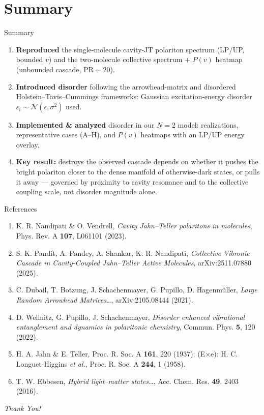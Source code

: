 \documentclass[aspectratio=169,11pt]{beamer}
\newcommand{\refJTa}{K. R. Nandipati \& O. Vendrell, \textit{Cavity Jahn--Teller polaritons in molecules}, Phys. Rev. A \textbf{107}, L061101 (2023).}
\newcommand{\refJTb}{S. K. Pandit, A. Pandey, A. Shankar, K. R. Nandipati, \textit{Collective Vibronic Cascade in Cavity-Coupled Jahn--Teller Active Molecules}, arXiv:2511.07880 (2025).}
\newcommand{\refArrow}{C. Dubail, T. Botzung, J. Schachenmayer, G. Pupillo, D. Hagenm\"uller, \textit{Large Random Arrowhead Matrices\ldots}, arXiv:2105.08444 (2021).}
\newcommand{\refWell}{D. Wellnitz, G. Pupillo, J. Schachenmayer, \textit{Disorder enhanced vibrational entanglement and dynamics in polaritonic chemistry}, Commun. Phys. \textbf{5}, 120 (2022).}
\newcommand{\refJahn}{H. A. Jahn \& E. Teller, Proc. R. Soc. A \textbf{161}, 220 (1937); (E$\times$e): H. C. Longuet-Higgins \textit{et al.}, Proc. R. Soc. A \textbf{244}, 1 (1958).}
\newcommand{\refEbbesen}{T. W. Ebbesen, \textit{Hybrid light--matter states\ldots}, Acc. Chem. Res. \textbf{49}, 2403 (2016).}
\begin{document}
\section*{Summary}
\begin{frame}{Summary}
  \small
  \begin{enumerate}
    \item \textbf{Reproduced} the single-molecule cavity-JT polariton spectrum
          (LP/UP, bounded $v$) and the two-molecule collective spectrum +
          $P(v)$ heatmap (unbounded cascade, $\mathrm{PR}\sim20$).
    \item \textbf{Introduced disorder} following the arrowhead-matrix and
          disordered Holstein--Tavis--Cummings frameworks: Gaussian excitation-energy
          disorder $\epsilon_i\sim\mathcal N(\epsilon,\sigma^2)$ used.
    \item \textbf{Implemented \& analyzed} disorder in our $N=2$ model:
          realizations, representative cases (A--H), and $P(v)$ heatmaps with an
          LP/UP energy overlay.
    \item \textbf{Key result:} destroys the observed cascade depends on whether it pushes the bright polariton closer to the dense manifold of otherwise-dark states, or pulls it away — governed by proximity to cavity resonance and to the collective coupling scale, not disorder magnitude alone.

  \end{enumerate}
\end{frame}

\begin{frame}{References}
  \footnotesize
  \begin{enumerate}
    \item \refJTa
    \item \refJTb
    \item \refArrow
    \item \refWell
    \item \refJahn
    \item \refEbbesen
  \end{enumerate}
\end{frame}

{
\begin{frame}
  \vfill
  \centering
  {\Huge\itshape Thank You!}
  \vfill
\end{frame}}
\end{document}
